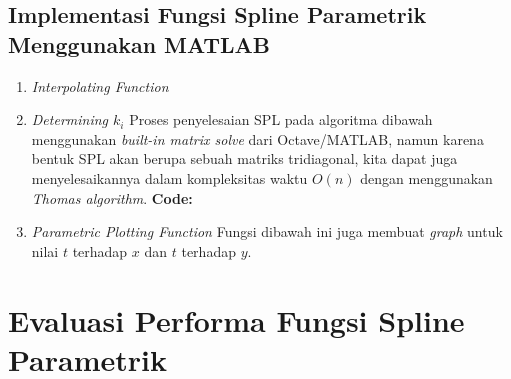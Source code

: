 \documentclass[journal,12pt,onecolumn,a4paper]{IEEEtran}
\begin{document}
\subsection{Implementasi Fungsi Spline Parametrik Menggunakan MATLAB}
\begin{enumerate}
	\item
	      \emph{Interpolating Function}
	      
	      \pagebreak
	\item
	      \emph{Determining \(k_i\)}
	      \newline
	      Proses penyelesaian SPL pada algoritma dibawah menggunakan \emph{built-in matrix solve} dari Octave/MATLAB, namun karena bentuk SPL akan berupa sebuah matriks tridiagonal, kita dapat juga menyelesaikannya dalam kompleksitas waktu \(O(n)\) dengan menggunakan \emph{Thomas algorithm}.
	      \textbf{Code:}
	      
	      \pagebreak
	\item
	      \emph{Parametric Plotting Function}
	      \newline
	      Fungsi dibawah ini juga membuat \emph{graph} untuk nilai \(t\) terhadap \(x\) dan \(t\) terhadap \(y\).
	      
\end{enumerate}

\section{Evaluasi Performa Fungsi Spline Parametrik}
\end{document}
